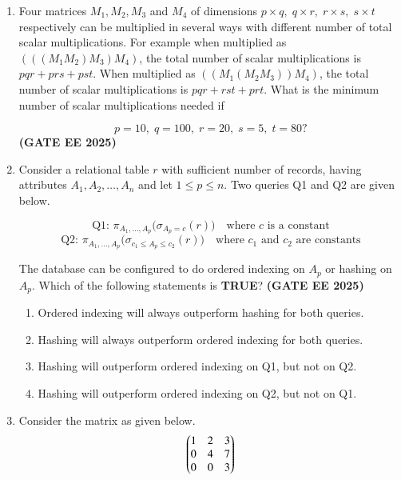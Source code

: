\documentclass[journal,12pt,onecolumn]{IEEEtran}
\theoremstyle{remark}
\begin{document}
\begin{enumerate}
\item Four matrices $M_1, M_2, M_3$ and $M_4$ of dimensions $p \times q, \; q \times r, \; r \times s, \; s \times t$ respectively can be multiplied in several ways with different number of total scalar multiplications. For example when multiplied as $(((M_1 M_2) M_3) M_4)$, the total number of scalar multiplications is $pqr + prs + pst$. When multiplied as $((M_1 (M_2 M_3)) M_4)$, the total number of scalar multiplications is $pqr + rst + prt$. What is the minimum number of scalar multiplications needed if

\[
p = 10, \; q = 100, \; r = 20, \; s = 5, \; t = 80 ?
\]
\hfill \textbf{(GATE EE 2025)}
\begin{enumerate}
\end{enumerate}


\item Consider a relational table $r$ with sufficient number of records, having attributes $A_1, A_2, \ldots, A_n$ and let $1 \leq p \leq n$. Two queries Q1 and Q2 are given below.

\[
\text{Q1: } \pi_{A_1,\ldots,A_p} \big( \sigma_{A_{p} = c}(r) \big) \quad \text{where $c$ is a constant}
\]
\[
\text{Q2: } \pi_{A_1,\ldots,A_p} \big( \sigma_{c_1 \leq A_{p} \leq c_2}(r) \big) \quad \text{where $c_1$ and $c_2$ are constants}
\]

The database can be configured to do ordered indexing on $A_p$ or hashing on $A_p$. Which of the following statements is \textbf{TRUE}?
\hfill \textbf{(GATE EE 2025)}
\begin{enumerate}
    \item Ordered indexing will always outperform hashing for both queries.
    \item Hashing will always outperform ordered indexing for both queries.
    \item Hashing will outperform ordered indexing on Q1, but not on Q2.
    \item Hashing will outperform ordered indexing on Q2, but not on Q1.
\end{enumerate}


\item  Consider the matrix as given below.
\begin{align}
    \begin{pmatrix}1 & 2 & 3\\ 0 & 4 & 7\\0 & 0 & 3\\\end{pmatrix}
\end{align}


\end{enumerate}
\end{document}

